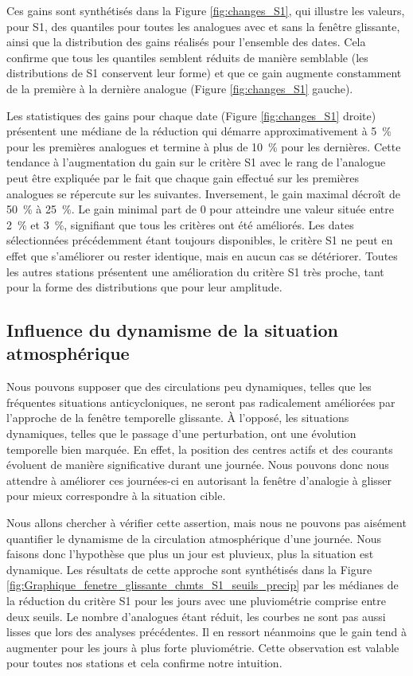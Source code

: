 \documentclass[hess]{copernicus}
\begin{document}
Ces gains sont synthétisés dans la Figure \ref{fig:changes_S1}, qui illustre les valeurs, pour S1, des quantiles pour toutes les analogues avec et sans la fenêtre glissante, ainsi que la distribution des gains réalisés pour l'ensemble des dates. Cela confirme que tous les quantiles semblent réduits de manière semblable (les distributions de S1 conservent leur forme) et que ce gain augmente constamment de la première à la dernière analogue (Figure \ref{fig:changes_S1} gauche). 

Les statistiques des gains pour chaque date (Figure \ref{fig:changes_S1} droite) présentent une médiane de la réduction qui démarre approximativement à 5~\% pour les premières analogues et termine à plus de 10~\% pour les dernières. Cette tendance à l'augmentation du gain sur le critère S1 avec le rang de l'analogue peut être expliquée par le fait que chaque gain effectué sur les premières analogues se répercute sur les suivantes. Inversement, le gain maximal décroît de 50~\% à 25~\%. Le gain minimal part de 0 pour atteindre une valeur située entre 2~\% et 3~\%, signifiant que tous les critères ont été améliorés. Les dates sélectionnées précédemment étant toujours disponibles, le critère S1 ne peut en effet que s'améliorer ou rester identique, mais en aucun cas se détériorer. Toutes les autres stations présentent une amélioration du critère S1 très proche, tant pour la forme des distributions que pour leur amplitude.



\subsection{Influence du dynamisme de la situation atmosphérique}
\label{sec:ameliorations:fenetre:S1_pluie}

Nous pouvons supposer que des circulations peu dynamiques, telles que les fréquentes situations anticycloniques, ne seront pas radicalement améliorées par l'approche de la fenêtre temporelle glissante. À l'opposé, les situations dynamiques, telles que le passage d'une perturbation, ont une évolution temporelle bien marquée. En effet, la position des centres actifs et des courants évoluent de manière significative durant une journée. Nous pouvons donc nous attendre à améliorer ces journées-ci en autorisant la fenêtre d'analogie à glisser pour mieux correspondre à la situation cible.

Nous allons chercher à vérifier cette assertion, mais nous ne pouvons pas aisément quantifier le dynamisme de la circulation atmosphérique d'une journée. Nous faisons donc l'hypothèse que plus un jour est pluvieux, plus la situation est dynamique. Les résultats de cette approche sont synthétisés dans la Figure \ref{fig:Graphique_fenetre_glissante_chmts_S1_seuils_precip} par les médianes de la réduction du critère S1 pour les jours avec une pluviométrie comprise entre deux seuils. Le nombre d'analogues étant réduit, les courbes ne sont pas aussi lisses que lors des analyses précédentes. Il en ressort néanmoins que le gain tend à augmenter pour les jours à plus forte pluviométrie. Cette observation est valable pour toutes nos stations et cela confirme notre intuition.
\end{document}
